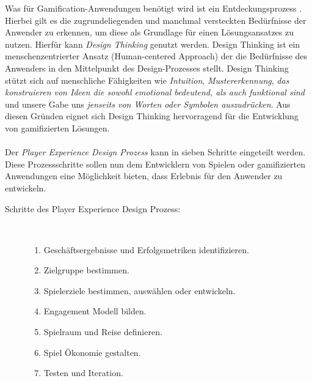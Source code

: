 \documentclass[a4paper,12pt,twoside]{scrartcl}
\begin{document}
Was für Gamification-Anwendungen benötigt wird ist ein Entdeckungsprozess \cite{gamificationDefinition}. Hierbei gilt es die zugrundeliegenden und manchmal versteckten Bedürfnisse der Anwender zu erkennen, um diese als Grundlage für einen Lösungsansatzes zu nutzen. Hierfür kann \textit{Design Thinking} genutzt werden. Design Thinking ist ein menschenzentrierter Ansatz (Human-centered Approach) der die Bedürfnisse des Anwenders in den Mittelpunkt des Design-Prozesses stellt. Design Thinking stützt sich auf menschliche Fähigkeiten wie \textit{Intuition}, \textit{Mustererkennung}, \textit{das konstruieren von Ideen die sowohl emotional bedeutend, als auch funktional sind} und unsere Gabe uns \textit{jenseits von Worten oder Symbolen auszudrücken}. Aus diesen Gründen eignet sich Design Thinking hervorragend für die Entwicklung von gamifizierten Lösungen.
\\\\
Der \textit{Player Experience Design Prozess} kann in sieben Schritte eingeteilt werden. Diese Prozessschritte sollen nun dem Entwicklern von Spielen oder gamifizierten Anwendungen eine Möglichkeit bieten, dass Erlebnis für den Anwender zu entwickeln.
\begin{description}
   \item[Schritte des Player Experience Design Prozess:]~\par
   \begin{enumerate}
      \item Geschäftsergebnisse und Erfolgsmetriken identifizieren.
      \item Zielgruppe bestimmen.
      \item Spielerziele bestimmen, auswählen oder entwickeln.
      \item Engagement Modell bilden.
      \item Spielraum und Reise definieren.
      \item Spiel Ökonomie gestalten.
      \item Testen und Iteration.
   \end{enumerate}
\end{description}
\end{document}
